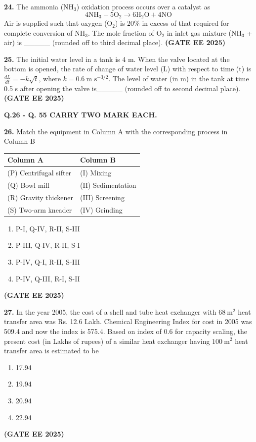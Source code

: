 \documentclass[journal,12pt,onecolumn]{IEEEtran}
\newcommand{\brak}[1]{(#1)}
\begin{document}
\noindent\textbf{24.} The ammonia \brak{NH$_{3}$} oxidation process occurs over a catalyst as
\[ 4\text{NH}_{3}+5\text{O}_{2}\rightarrow6\text{H}_{2}\text{O}+4\text{NO} \]
Air is supplied such that oxygen \brak{O$_2$} is 20\% in excess of that required for complete conversion of NH$_3$. The mole fraction of O$_2$ in inlet gas mixture \brak{NH$_3$ + air} is \_\_\_\_\_ \brak{rounded off to third decimal place}.
\hfill \textbf{\brak{GATE EE 2025}}

\noindent\textbf{25.} The initial water level in a tank is 4 m. When the valve located at the bottom is opened, the rate of change of water level \brak{L} with respect to time \brak{t} is $\frac{dL}{dt}=-k\sqrt{t}$, where $k=0.6~\text{m s}^{-3/2}$. The level of water \brak{in m} in the tank at time 0.5 s after opening the valve is\_\_\_\_\_ \brak{rounded off to second decimal place}.
\hfill \textbf{\brak{GATE EE 2025}}

\newpage
\noindent\textbf{Q.26 - Q. 55 CARRY TWO MARK EACH.}


\noindent\textbf{26.} Match the equipment in Column A with the corresponding process in Column B
\begin{longtable}{|p{4cm}|p{6cm}|}
\hline
\textbf{Column A} & \textbf{Column B} \\
\hline
\brak{P} Centrifugal sifter & \brak{I} Mixing \\
\hline
\brak{Q} Bowl mill & \brak{II} Sedimentation \\
\hline
\brak{R} Gravity thickener & \brak{III} Screening \\
\hline
\brak{S} Two-arm kneader & \brak{IV} Grinding \\
\hline
\end{longtable}
\begin{enumerate}
    \item P-I, Q-IV, R-II, S-III
    \item P-III, Q-IV, R-II, S-I
    \item P-IV, Q-I, R-II, S-III
    \item P-IV, Q-III, R-I, S-II
\end{enumerate}
\hfill \textbf{\brak{GATE EE 2025}}

\noindent\textbf{27.} In the year 2005, the cost of a shell and tube heat exchanger with $68~\text{m}^{2}$ heat transfer area was Rs. 12.6 Lakh. Chemical Engineering Index for cost in 2005 was 509.4 and now the index is 575.4. Based on index of 0.6 for capacity scaling, the present cost \brak{in Lakhs of rupees} of a similar heat exchanger having $100~\text{m}^{2}$ heat transfer area is estimated to be
\begin{enumerate}
    \item 17.94
    \item 19.94
    \item 20.94
    \item 22.94
\end{enumerate}
\hfill \textbf{\brak{GATE EE 2025}}
\end{document}
